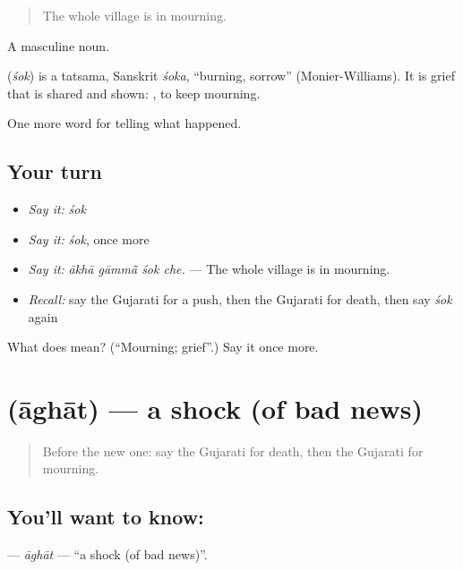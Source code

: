 \begin{quote}
The whole village is in mourning.
\end{quote}

A masculine noun.

\begin{cousinweb}
\textbf{} (\emph{śok}) is a tatsama, Sanskrit \emph{śoka}, \textquotedblleft{}burning, sorrow\textquotedblright{} (Monier-Williams). It is grief that is shared and shown: \textbf{ }, to keep mourning.
\end{cousinweb}

\begin{grammarlens}[title={What you've built}]
One more word for telling what happened.
\end{grammarlens}

\subsection*{Your turn}
\begin{itemize}
\raggedright
  \item \emph{Say it:} \emph{śok}
  \item \emph{Say it:} \emph{śok}, once more
  \item \emph{Say it:} \emph{ākhā gāmmā̃ śok che.} — The whole village is in mourning.
  \item \emph{Recall:} say the Gujarati for a push, then the Gujarati for death, then say \emph{śok} again
\end{itemize}

\begin{tcolorbox}[breakable,colback=teal!4,colframe=teal!35!black,title={Before you move on}]
What does  mean? (\textquotedblleft{}Mourning; grief\textquotedblright{}.) Say it once more.
\end{tcolorbox}
\section[\texorpdfstring{\gu{આઘાત} (āghāt)}{આઘાત (āghāt)}]{ (āghāt) — a shock (of bad news)}

\label{lesson:GU-C298-aghat}



\begin{quote}
Before the new one: say the Gujarati for death, then the Gujarati for mourning.
\end{quote}

\subsection*{You'll want to know: }
\textbf{} — \emph{āghāt} — \textquotedblleft{}a shock (of bad news)\textquotedblright{}.


